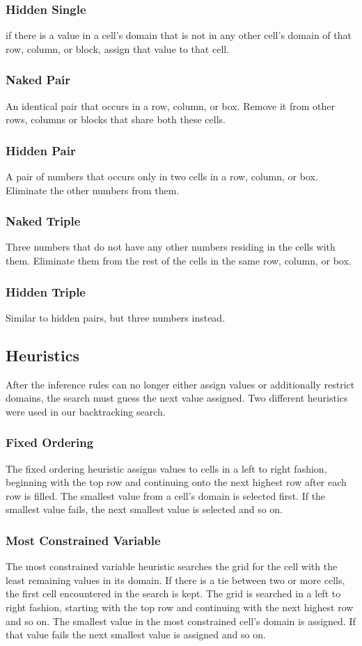 \documentclass{article}
\begin{document}
\subsubsection{Hidden Single}
if there is a value in a cell's domain that is not in any other cell's domain of that row, column, or block, assign that value to that cell.
\subsubsection{Naked Pair}
An identical pair that occurs in a row, column, or box. Remove it from other rows, columns or blocks that share both these cells.
\subsubsection{Hidden Pair}
A pair of numbers that occurs only in two cells in a row, column, or box. Eliminate the other numbers from them.
\subsubsection{Naked Triple}
Three numbers that do not have any other numbers residing in the cells with them. Eliminate them from the rest of the cells in the same row, column, or box. 
\subsubsection{Hidden Triple}
Similar to hidden pairs, but three numbers instead.
\subsection{Heuristics}
After the inference rules can no longer either assign values or additionally restrict domains, the search must guess the next value assigned. Two different heuristics were used in our backtracking search. 
\subsubsection{Fixed Ordering}
The fixed ordering heuristic assigns values to cells in a left to right fashion, beginning with the top row and continuing onto the next highest row after each row is filled. The smallest value from a cell's domain is selected first. If the smallest value fails, the next smallest value is selected and so on.
\subsubsection{Most Constrained Variable}
The most constrained variable heuristic searches the grid for the cell with the least remaining values in its domain. If there is a tie between two or more cells, the first cell encountered in the search is kept. The grid is searched in a left to right fashion, starting with the top row and continuing with the next highest row and so on. The smallest value in the most constrained cell's domain is assigned. If that value fails the next smallest value is assigned and so on.
\end{document}

